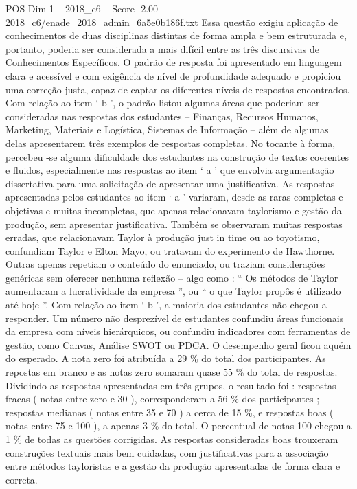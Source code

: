 \begin{textsample}{POS Dim 1 – 2018\_c6 – Score -2.00 – 2018\_c6/enade\_2018\_admin\_6a5e0b186f.txt}
Essa questão exigiu aplicação de conhecimentos de duas disciplinas distintas de forma ampla e bem estruturada e, portanto, poderia ser considerada a mais difícil entre as três discursivas de Conhecimentos Específicos.
O padrão de resposta foi apresentado em linguagem clara e acessível e com exigência de nível de profundidade adequado e propiciou uma correção justa, capaz de captar os diferentes níveis de respostas encontrados.
Com relação ao item ‘ b ’, o padrão listou algumas áreas que poderiam ser consideradas nas respostas dos estudantes – Finanças, Recursos Humanos, Marketing, Materiais e Logística, Sistemas de Informação – além de algumas delas apresentarem três exemplos de respostas completas.
No tocante à forma, percebeu -se alguma dificuldade dos estudantes na construção de textos coerentes e fluidos, especialmente nas respostas ao item ‘ a ’ que envolvia argumentação dissertativa para uma solicitação de apresentar uma justificativa.
As respostas apresentadas pelos estudantes ao item ‘ a ’ variaram, desde as raras completas e objetivas e muitas incompletas, que apenas relacionavam taylorismo e gestão da produção, sem apresentar justificativa.
Também se observaram muitas respostas erradas, que relacionavam Taylor à produção just in time ou ao toyotismo, confundiam Taylor e Elton Mayo, ou tratavam do experimento de Hawthorne.
Outras apenas repetiam o conteúdo do enunciado, ou traziam considerações genéricas sem oferecer nenhuma reflexão – algo como : “ Os métodos de Taylor aumentaram a lucratividade da empresa ”, ou “ o que Taylor propôs é utilizado até hoje ”.
Com relação ao item ‘ b ’, a maioria dos estudantes não chegou a responder.
Um número não desprezível de estudantes confundiu áreas funcionais da empresa com níveis hierárquicos, ou confundiu indicadores com ferramentas de gestão, como Canvas, Análise SWOT ou PDCA.
O desempenho geral ficou aquém do esperado.
A nota zero foi atribuída a 29 \% do total dos participantes.
As repostas em branco e as notas zero somaram quase 55 \% do total de respostas.
Dividindo as respostas apresentadas em três grupos, o resultado foi : respostas fracas ( notas entre zero e 30 ), corresponderam a 56 \% dos participantes ; respostas medianas ( notas entre 35 e 70 ) a cerca de 15 \%, e respostas boas ( notas entre 75 e 100 ), a apenas 3 \% do total.
O percentual de notas 100 chegou a 1 \% de todas as questões corrigidas.
As respostas consideradas boas trouxeram construções textuais mais bem cuidadas, com justificativas para a associação entre métodos tayloristas e a gestão da produção apresentadas de forma clara e correta.

\end{textsample}
